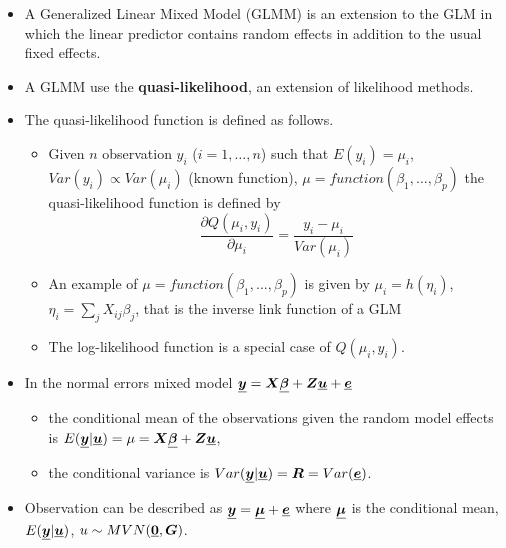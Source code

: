 


\begin{frame}
  \begin{itemize}
    \item A Generalized Linear Mixed Model (GLMM) is an extension to the GLM in which the linear predictor contains random effects in addition to the usual fixed effects.
    \vspace{0.1cm}
    \item A GLMM use the \textbf{quasi-likelihood}, an extension of likelihood methods.
    \item The quasi-likelihood function is defined as follows.
      \begin{itemize}
        \item Given $ n $ observation $ y_i $ ($ i = 1, \dots, n $) such that $ E(y_i) = \mu_i $, $ Var(y_i) \propto Var(\mu_i) $ (known function), $ \mu = function(\beta_1, \dots, \beta_p) $ the quasi-likelihood function is defined by
         $$ \frac{\partial Q(\mu_i, y_i)}{\partial \mu_i} = \frac{y_i - \mu_i}{Var(\mu_i)} $$
        \item An example of $ \mu = function(\beta_1, \dots, \beta_p) $ is given by $ \mu_i = h(\eta_i) $, $ \eta_i = \sum_j X_{ij} \beta_j $, that is the inverse link function of a GLM
        \item The log-likelihood function is a special case of $ Q(\mu_i, y_i) $.
      \end{itemize}
  \end{itemize}
\end{frame}




\begin{frame}
  \begin{itemize}
    \vspace{0.75cm}
    \item In the normal errors mixed model $ \boldsymbol{\underline{y}} = \boldsymbol{X} \boldsymbol{\underline{\beta}} + \boldsymbol{Z} \boldsymbol{\underline{u}} + \boldsymbol{\underline{e}} $
      \begin{itemize}
        \vspace{0.25cm}
        \item the conditional mean of the observations given the random model effects is $ E(\boldsymbol{\underline{y}}|\boldsymbol{\underline{u}}) = \mu = \boldsymbol{X} \boldsymbol{\underline{\beta}} + \boldsymbol{Z} \boldsymbol{\underline{u}} $,
        \vspace{0.25cm}
        \item the conditional variance is $ Var(\boldsymbol{\underline{y}}|\boldsymbol{\underline{u}}) = \boldsymbol{R} = Var(\boldsymbol{\underline{e}}) $.
      \end{itemize}
    \vspace{0.75cm}
    \item Observation can be described as $ \boldsymbol{\underline{y}} = \boldsymbol{\underline{\mu}} + \boldsymbol{\underline{e}} $ where $ \boldsymbol{\underline{\mu}} $ is the conditional mean, $ E(\boldsymbol{\underline{y}}|\boldsymbol{\underline{u}}) $, $ u \sim MVN(\boldsymbol{\underline{0}}, \boldsymbol{G})$. 
  \end{itemize}
\end{frame}

